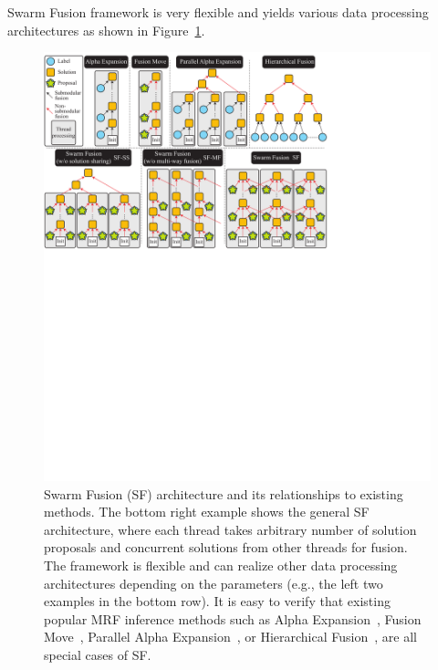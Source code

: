 Swarm Fusion framework is very flexible and yields various data
processing architectures as shown in Figure~\ref{fig:model}.
%
\begin{figure}[tb]
 \includegraphics[width=\columnwidth]{figure/model.pdf} \caption{Swarm
   Fusion (SF) architecture and its relationships to existing methods. The
 bottom right example shows the general SF architecture, where
 each thread takes arbitrary number of solution proposals and concurrent
 solutions from other threads for fusion. The framework is flexible and
 can realize other data processing architectures depending on the
 parameters (e.g., the left two examples in the bottom row).
 It is easy to verify that existing popular MRF inference methods such
 as Alpha Expansion~\cite{alpha_expansion}, Fusion Move~\cite{fusion_moves_for_markov_random_field_optimization},
 Parallel Alpha Expansion~\cite{olga_hierarchical_alpha_expansion}, or Hierarchical
 Fusion~\cite{delong_hierarchical_fusion}, are all special cases of
 SF.}
\label{fig:model}
\end{figure}
